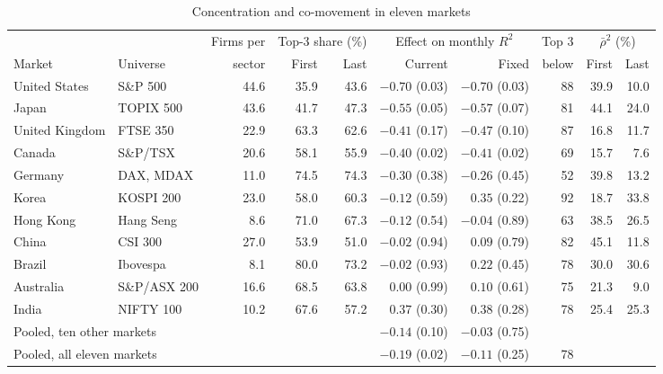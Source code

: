 \documentclass[11pt]{article}
\begin{document}
\begin{table}[H]
\centering
\caption{Concentration and co-movement in eleven markets}
\label{tab:intl}
\footnotesize
\setlength{\tabcolsep}{4pt}
\begin{tabular}{llrrrrrrrr}
\toprule
& & Firms per & \multicolumn{2}{c}{Top-3 share (\%)} & \multicolumn{2}{c}{Effect on monthly $R^2$} & Top 3 & \multicolumn{2}{c}{$\bar\rho^2$ (\%)} \\
\cmidrule(lr){4-5}\cmidrule(lr){6-7}\cmidrule(lr){9-10}
Market & Universe & sector & First & Last & Current & Fixed & below & First & Last \\
\midrule
United States & S\&P 500 & 44.6 & 35.9 & 43.6 & $-0.70$ (0.03) & $-0.70$ (0.03) & 88 & 39.9 & 10.0 \\
Japan & TOPIX 500 & 43.6 & 41.7 & 47.3 & $-0.55$ (0.05) & $-0.57$ (0.07) & 81 & 44.1 & 24.0 \\
United Kingdom & FTSE 350 & 22.9 & 63.3 & 62.6 & $-0.41$ (0.17) & $-0.47$ (0.10) & 87 & 16.8 & 11.7 \\
Canada & S\&P/TSX & 20.6 & 58.1 & 55.9 & $-0.40$ (0.02) & $-0.41$ (0.02) & 69 & 15.7 & 7.6 \\
Germany & DAX, MDAX & 11.0 & 74.5 & 74.3 & $-0.30$ (0.38) & $-0.26$ (0.45) & 52 & 39.8 & 13.2 \\
Korea & KOSPI 200 & 23.0 & 58.0 & 60.3 & $-0.12$ (0.59) & $0.35$ (0.22) & 92 & 18.7 & 33.8 \\
Hong Kong & Hang Seng & 8.6 & 71.0 & 67.3 & $-0.12$ (0.54) & $-0.04$ (0.89) & 63 & 38.5 & 26.5 \\
China & CSI 300 & 27.0 & 53.9 & 51.0 & $-0.02$ (0.94) & $0.09$ (0.79) & 82 & 45.1 & 11.8 \\
Brazil & Ibovespa & 8.1 & 80.0 & 73.2 & $-0.02$ (0.93) & $0.22$ (0.45) & 78 & 30.0 & 30.6 \\
Australia & S\&P/ASX 200 & 16.6 & 68.5 & 63.8 & $0.00$ (0.99) & $0.10$ (0.61) & 75 & 21.3 & 9.0 \\
India & NIFTY 100 & 10.2 & 67.6 & 57.2 & $0.37$ (0.30) & $0.38$ (0.28) & 78 & 25.4 & 25.3 \\
\midrule
\multicolumn{5}{l}{Pooled, ten other markets} & $-0.14$ (0.10) & $-0.03$ (0.75) & & & \\
\multicolumn{5}{l}{Pooled, all eleven markets} & $-0.19$ (0.02) & $-0.11$ (0.25) & 78 & & \\
\bottomrule
\end{tabular}


\end{table}
\end{document}
